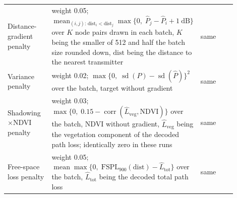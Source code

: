\begin{tabular}{>{\raggedright\arraybackslash}p{0.22\linewidth}>{\raggedright\arraybackslash}p{0.43\linewidth}>{\raggedright\arraybackslash}p{0.25\linewidth}}
Distance-gradient penalty & weight 0.05; $\operatorname{mean}_{(i,j):\,\mathrm{dist}_i<\mathrm{dist}_j}\max\{0,\;\hat P_j-\hat P_i+1~\mathrm{dB}\}$ over $K$ node pairs drawn in each batch, $K$ being the smaller of 512 and half the batch size rounded down, $\mathrm{dist}$ being the distance to the nearest transmitter & same \\
Variance penalty & weight 0.02; $\max\{0,\;\operatorname{sd}(P)-\operatorname{sd}(\hat P)\}^{2}$ over the batch, target without gradient & same \\
Shadowing$\times$NDVI penalty & weight 0.03; $\max\{0,\;0.15-\operatorname{corr}(\hat L_{\mathrm{veg}},\mathrm{NDVI})\}$ over the batch, NDVI without gradient, $\hat L_{\mathrm{veg}}$ being the vegetation component of the decoded path loss; identically zero in these runs & same \\
Free-space loss penalty & weight 0.05; $\operatorname{mean}\max\{0,\;\mathrm{FSPL}_{900}(\mathrm{dist})-\hat L_{\mathrm{tot}}\}$ over the batch, $\hat L_{\mathrm{tot}}$ being the decoded total path loss & same \\
\bottomrule
\end{tabular}
